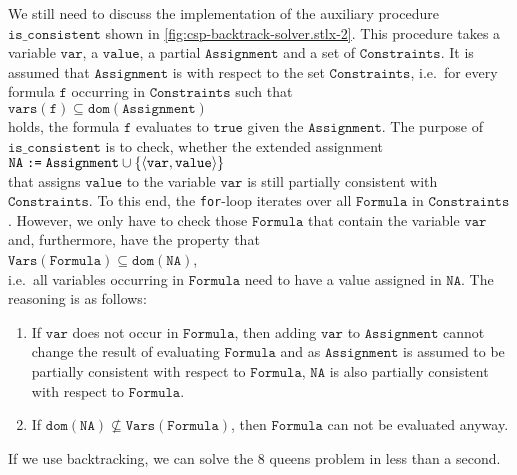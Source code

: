 We still need to discuss the implementation of the auxiliary procedure $\texttt{is\_consistent}$
shown in \ref{fig:csp-backtrack-solver.stlx-2}.  This procedure takes a variable $\texttt{var}$, a $\texttt{value}$, a partial 
$\texttt{Assignment}$ and a set of $\texttt{Constraints}$.  It is assumed that $\texttt{Assignment}$ is
 with respect to the set $\texttt{Constraints}$, i.e.~for every formula $\texttt{f}$
occurring in $\texttt{Constraints}$ such that
\\[0.2cm]
\hspace*{1.3cm}
$\texttt{vars}(\texttt{f}) \subseteq \texttt{dom}(\texttt{Assignment})$
\\[0.2cm]
holds, the formula $\texttt{f}$ evaluates to $\texttt{true}$ given the $\texttt{Assignment}$.  The purpose of
$\texttt{is\_consistent}$ is to check, whether the extended assignment
\\[0.2cm]
\hspace*{1.3cm}
$\texttt{NA} \;\texttt{:=}\;\texttt{Assignment} \cup \{ \pair(\texttt{var}, \texttt{value}) \}$
\\[0.2cm]
that assigns $\texttt{value}$ to the variable $\texttt{var}$ is still partially consistent with $\texttt{Constraints}$. 
To this end, the \texttt{for}-loop iterates over all $\texttt{Formula}$ in $\texttt{Constraints}$. 
However, we only have to check those $\texttt{Formula}$ that contain the variable $\texttt{var}$ and,
furthermore, have the property that
\\[0.2cm]
\hspace*{1.3cm}
$\texttt{Vars}(\texttt{Formula}) \subseteq \texttt{dom}(\texttt{NA})$,
\\[0.2cm]
i.e.~all variables occurring in $\texttt{Formula}$ need to have a value assigned in
$\texttt{NA}$.  The reasoning is as follows:
\begin{enumerate}
\item If $\texttt{var}$ does not occur in $\texttt{Formula}$, then adding $\texttt{var}$ to
      $\texttt{Assignment}$ cannot change the result of evaluating $\texttt{Formula}$ and as
      $\texttt{Assignment}$ is assumed to be partially consistent with respect to $\texttt{Formula}$, 
      $\texttt{NA}$ is also partially consistent with respect to $\texttt{Formula}$.
\item If $\texttt{dom}(\texttt{NA}) \not\subseteq \texttt{Vars}(\texttt{Formula})$, then $\texttt{Formula}$ can not be evaluated anyway. 
\end{enumerate}
If we use backtracking, we can solve the 8 queens problem in less than a second.

